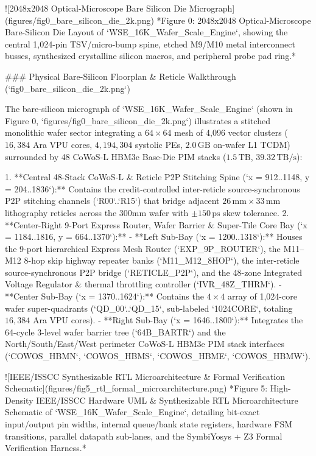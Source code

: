 \documentclass[journal,10pt,twocolumn]{IEEEtran}
\begin{document}
![2048x2048 Optical-Microscope Bare Silicon Die Micrograph](figures/fig0_bare_silicon_die_2k.png)
*Figure 0: 2048x2048 Optical-Microscope Bare-Silicon Die Layout of `WSE_16K_Wafer_Scale_Engine`, showing the central 1,024-pin TSV/micro-bump spine, etched M9/M10 metal interconnect busses, synthesized crystalline silicon macros, and peripheral probe pad ring.*

### Physical Bare-Silicon Floorplan & Reticle Walkthrough (`fig0_bare_silicon_die_2k.png`)

The bare-silicon micrograph of `WSE_16K_Wafer_Scale_Engine` (shown in Figure 0, `figures/fig0_bare_silicon_die_2k.png`) illustrates a stitched monolithic wafer sector integrating a $64 \times 64$ mesh of 4,096 vector clusters ($16,384$ Ara VPU cores, $4,194,304$ systolic PEs, $2.0\,\mathrm{GB}$ on-wafer L1 TCDM) surrounded by 48 CoWoS-L HBM3e Base-Die PIM stacks ($1.5\,\mathrm{TB}$, $39.32\,\mathrm{TB/s}$):

1. **Central 48-Stack CoWoS-L & Reticle P2P Stitching Spine (`x = 912..1148, y = 204..1836`):** Contains the credit-controlled inter-reticle source-synchronous P2P stitching channels (`R00`..`R15`) that bridge adjacent $26\,\mathrm{mm} \times 33\,\mathrm{mm}$ lithography reticles across the 300mm wafer with $\pm 150\,\mathrm{ps}$ skew tolerance.
2. **Center-Right 9-Port Express Router, Wafer Barrier & Super-Tile Core Bay (`x = 1184..1816, y = 664..1370`):**
   - **Left Sub-Bay (`x = 1200..1318`):** Houses the 9-port hierarchical Express Mesh Router (`EXP_9P_ROUTER`), the M11–M12 8-hop skip highway repeater banks (`M11_M12_8HOP`), the inter-reticle source-synchronous P2P bridge (`RETICLE_P2P`), and the 48-zone Integrated Voltage Regulator & thermal throttling controller (`IVR_48Z_THRM`).
   - **Center Sub-Bay (`x = 1370..1624`):** Contains the $4 \times 4$ array of 1,024-core wafer super-quadrants (`QD_00`..`QD_15`, sub-labeled `1024CORE`, totaling $16,384$ Ara VPU cores).
   - **Right Sub-Bay (`x = 1646..1800`):** Integrates the 64-cycle 3-level wafer barrier tree (`64B_BARTR`) and the North/South/East/West perimeter CoWoS-L HBM3e PIM stack interfaces (`COWOS_HBMN`, `COWOS_HBMS`, `COWOS_HBME`, `COWOS_HBMW`).

![IEEE/ISSCC Synthesizable RTL Microarchitecture & Formal Verification Schematic](figures/fig5_rtl_formal_microarchitecture.png)
*Figure 5: High-Density IEEE/ISSCC Hardware UML & Synthesizable RTL Microarchitecture Schematic of `WSE_16K_Wafer_Scale_Engine`, detailing bit-exact input/output pin widths, internal queue/bank state registers, hardware FSM transitions, parallel datapath sub-lanes, and the SymbiYosys + Z3 Formal Verification Harness.*
\end{document}
